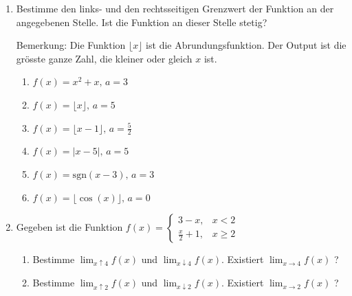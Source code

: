 \begin{ueb}{}{}
\begin{enumerate}
    \item Bestimme den links- und den rechtsseitigen Grenzwert der Funktion an der angegebenen Stelle. Ist die Funktion an dieser Stelle stetig?

    Bemerkung: Die Funktion $\lfloor x \rfloor$ ist die Abrundungsfunktion. Der Output ist die grösste ganze Zahl, die kleiner oder gleich $x$ ist.
    \begin{enumerate}
        \item $f(x)=x^2+x, \, a=3$
        \item  $f(x)=\lfloor x \rfloor, \, a=5$
        \item  $f(x)=\lfloor x-1 \rfloor, \, a=\frac{5}{2}$
        \item  $f(x)=\lvert x-5 \rvert, \, a=5$
        \item  $f(x)=\mathrm{sgn}(x-3), \, a=3$
        \item  $f(x)=\lfloor \cos(x)\rfloor, \, a=0$
    \end{enumerate}
    \item Gegeben ist die Funktion $f(x) = \left\{\begin{array}{ll}
        3-x, & x<2 \\\frac{x}{2}+1, &x\ge 2        
    \end{array}\right.$
    \begin{enumerate}
        \item Bestimme $\lim_{x\uparrow 4} f(x)$ und $\lim_{x\downarrow 4} f(x)$. Existiert $\lim_{x\to 4} f(x)$  ?
        \item Bestimme $\lim_{x\uparrow 2} f(x)$ und $\lim_{x\downarrow 2} f(x)$. Existiert $\lim_{x\to 2} f(x)$  ?
    \end{enumerate}
\end{enumerate}
\end{ueb}

